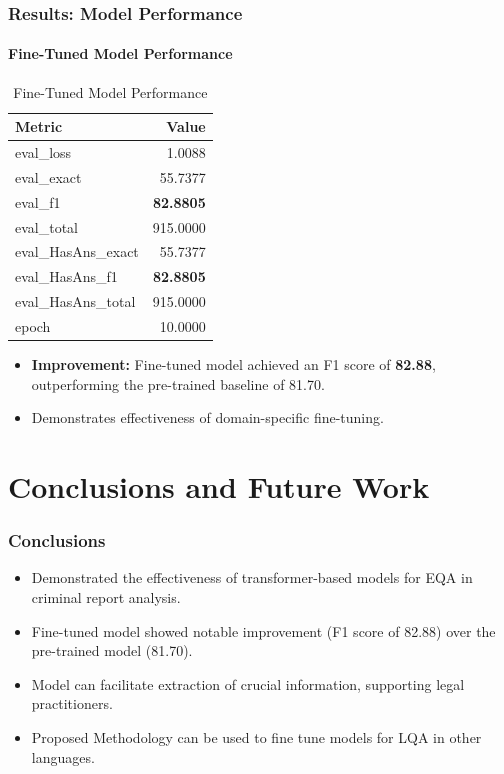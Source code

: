 \documentclass{beamer}
\begin{document}
\begin{frame}
    \frametitle{Results: Model Performance}
    \framesubtitle{Fine-Tuned Model Performance}
    \begin{table}[h]
      \centering
      \small
      \caption{Fine-Tuned Model Performance}
      \label{tab:finetunedModel-slide}
      \begin{tabular}{lr}
    \toprule
    Metric & Value \\
    \midrule
    eval\_loss & 1.0088 \\
    eval\_exact & 55.7377 \\
    eval\_f1 & \textbf{82.8805} \\
    eval\_total & 915.0000 \\
    eval\_HasAns\_exact & 55.7377 \\
    eval\_HasAns\_f1 & \textbf{82.8805} \\
    eval\_HasAns\_total & 915.0000 \\
    epoch & 10.0000 \\
    \bottomrule
    \end{tabular}
    \end{table}
    \begin{itemize}
        \item \textbf{Improvement:} Fine-tuned model achieved an F1 score of \textbf{82.88}, outperforming the pre-trained baseline of 81.70.
        \item Demonstrates effectiveness of domain-specific fine-tuning.
    \end{itemize}
\end{frame}

\section{Conclusions and Future Work}
\label{sec:conclusions}


\begin{frame}
    \frametitle{Conclusions}
    \begin{itemize}
    \item Demonstrated the effectiveness of transformer-based models
      for \ac{EQA} in criminal report analysis.
    \item Fine-tuned model showed notable improvement (F1 score of
      82.88) over the pre-trained model (81.70).
    \item Model can facilitate extraction of crucial information,
      supporting legal practitioners.
    \item Proposed Methodology can be used to fine tune models for
      \ac{LQA} in other languages.
    \end{itemize}
\end{frame}
\end{document}
